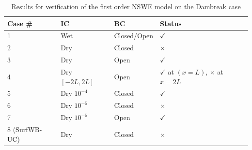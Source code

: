 	\begin{table}[]
	\centering
	\label{my-label}
	\begin{tabular}{|l|l|l|l|}
	\hline
	\textbf{Case \#} & \textbf{IC}    & \textbf{BC} & \textbf{Status}                  \\ \hline
	1                & Wet            & Closed/Open & $\checkmark$                       \\ \hline
	2                & Dry            & Closed      & $\times$                             \\ \hline
	3                & Dry            & Open        & $\checkmark$                       \\ \hline
	4                & Dry $[-2L,2L]$ & Open        & $\checkmark$ at $(x=L)$, $\times$ at $x=2L$ \\ \hline
	5                & Dry $10^{-4}$  & Closed      & $\checkmark$                          \\ \hline
	6                & Dry $10^{-5}$  & Closed      & $\times$                   		\\ \hline
	7                & Dry $10^{-5}$  & Open        & $\checkmark$                           \\ \hline
	8 (SurfWB-UC)    & Dry            & Closed      & $\times$                         \\ \hline
	\end{tabular}
	\caption{Results for verification of the first order NSWE model on the Dambreak case}
	\label{nswe:dbresults}
	\end{table}

